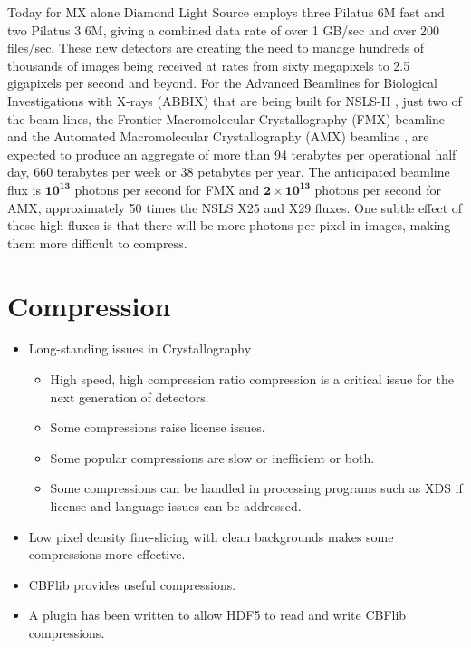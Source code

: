 \documentclass[11pt]{a0poster}
\begin{document}
\begin{minipage}[]{0.29\linewidth}
\vspace{-3mm}
Today for MX alone Diamond Light
Source employs  three Pilatus 6M fast and two Pilatus 3
6M, giving a combined data rate of over 1 GB/sec and over 200 files/sec.
These new detectors are creating the need to manage hundreds of thousands of
images being received at rates from sixty megapixels to 2.5 gigapixels per second and beyond.
For the Advanced Beamlines for Biological Investigations with 
X-rays (ABBIX) that are being built for NSLS-II \cite{Hendrickson2012}, just two of the beam lines,
the Frontier Macromolecular Crystallography (FMX) beamline and the Automated Macromolecular Crystallography (AMX) beamline \cite{Schneider2012}, are expected to produce an aggregate of more than 94 terabytes per operational half day,
 660 terabytes per week or 38 petabytes per year.   The anticipated beamline flux is $\mathbf{10^{13}}$ photons per second for FMX and  $\mathbf{2 \times 10^{13}}$ photons 
per second for AMX, approximately 50 times the NSLS X25 and X29 fluxes.  One subtle effect of
these high fluxes is that there will be more photons per pixel in images, making them more
difficult to compress.
\vspace{-6mm}
\section*{Compression}
\fontsize{18}{22}\selectfont %
\begin{itemize}
\vspace{-2mm}
\item{Long-standing issues in Crystallography
\begin{itemize}
\item{High speed, high compression ratio compression is a critical issue for the next generation of detectors.}
\vspace{-2mm}
\item{Some compressions raise license issues.} 
\vspace{-2mm}
\item{Some popular compressions are slow or inefficient or both.}
\vspace{-2mm}
\item{Some compressions can be handled in processing programs such as XDS if license and language issues can be addressed.}
\end{itemize}}
\vspace{-2mm}
\item{Low pixel density fine-slicing with clean backgrounds makes some compressions more effective.}
\vspace{-2mm}
\item{CBFlib provides useful compressions.}
\vspace{-2mm}
\item{A plugin has been written to allow HDF5 to read and write CBFlib compressions.}
\end{itemize}
\vspace{-2mm}


\end{minipage}
\end{document}
